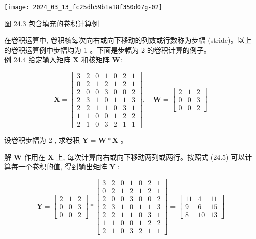 \documentclass[10pt]{article}
\begin{document}
\begin{center}
\texttt{[image: 2024\_03\_13\_fc25db59b1a18f350d07g-02]}
\end{center}

图 24.3 包含填充的卷积计算例

在卷积运算中, 卷积核每次向右或向下移动的列数或行数称为步幅 (stride)。以上的卷积运算例中步幅均为 1 。下面是步幅为 2 的卷积计算的例子。\\
例 24.4 给定输入矩阵 $\boldsymbol{X}$ 和核矩阵 $\boldsymbol{W}:$

$$
\boldsymbol{X}=\left[\begin{array}{lllllll}
3 & 2 & 0 & 1 & 0 & 2 & 1 \\
0 & 2 & 1 & 2 & 1 & 2 & 1 \\
2 & 0 & 0 & 3 & 0 & 0 & 2 \\
2 & 3 & 1 & 0 & 1 & 1 & 3 \\
2 & 2 & 1 & 1 & 0 & 3 & 1 \\
1 & 1 & 0 & 0 & 1 & 2 & 2 \\
2 & 1 & 0 & 3 & 2 & 1 & 1
\end{array}\right], \quad \boldsymbol{W}=\left[\begin{array}{lll}
2 & 1 & 2 \\
0 & 0 & 3 \\
0 & 0 & 2
\end{array}\right]
$$

设卷积步幅为 2 , 求卷积 $\boldsymbol{Y}=\boldsymbol{W} * \boldsymbol{X}$ 。

解 $\boldsymbol{W}$ 作用在 $\boldsymbol{X}$ 上, 每次计算向右或向下移动两列或两行。按照式 (24.5) 可以计算每一个卷积的值, 得到输出矩阵 $\boldsymbol{Y}$ :

$$
\boldsymbol{Y}=\left[\begin{array}{lll}
2 & 1 & 2 \\
0 & 0 & 3 \\
0 & 0 & 2
\end{array}\right] *\left[\begin{array}{ccccccc}
3 & 2 & 0 & 1 & 0 & 2 & 1 \\
0 & 2 & 1 & 2 & 1 & 2 & 1 \\
2 & 0 & 0 & 3 & 0 & 0 & 2 \\
2 & 3 & 1 & 0 & 1 & 1 & 3 \\
2 & 2 & 1 & 1 & 0 & 3 & 1 \\
1 & 1 & 0 & 0 & 1 & 2 & 2 \\
2 & 1 & 0 & 3 & 2 & 1 & 1
\end{array}\right]=\left[\begin{array}{ccc}
11 & 4 & 11 \\
9 & 6 & 15 \\
8 & 10 & 13
\end{array}\right]
$$
\end{document}
